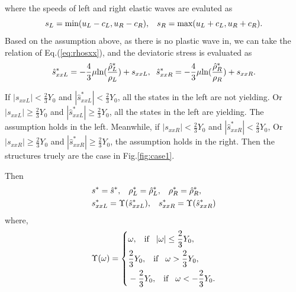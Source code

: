 \documentclass{article}
\numberwithin{equation}{section}
\numberwithin{table}{section}
\begin{document}
where the speeds of left and right elastic waves are evaluted as
	\begin{equation}\label{eq:sLR}
	  s_L = \text{min} (u_L-c_L, u_R-c_R), \hspace{0.3cm} s_R = \text{max}(u_L+c_L, u_R+c_R).
	\end{equation}
Based on the assumption above, as there is no plastic wave in, we can take the relation of Eq.(\ref{eq:rhosxx}), and the deviatoric stress is evaluated as
\begin{equation}
  \hat{s}_{xxL}^*=-\frac{4}{3}\mu\text{ln}(\frac{\hat{\rho}_L^*}{\rho_L})+s_{xxL},\hspace{0.2cm}  \hat{s}_{xxR}^*=-\frac{4}{3}\mu\text{ln}(\frac{\hat{\rho}_R^*}{\rho_R})+s_{xxR}.
\end{equation}

If $|s_{xxL}|<\frac{2}{3}Y_0$ and $|\hat{s}_{xxL}^*| < \frac{2}{3}Y_0$, all the states in the left are not yielding. Or  $|s_{xxL}| \ge \frac{2}{3}Y_0$ and $|\hat{s}_{xxL}^*| \ge  \frac{2}{3}Y_0$, all the states in the left are yielding. The assumption  holds in the left.
Meanwhile, if $|s_{xxR}|<\frac{2}{3}Y_0$ and $|\hat{s}_{xxR}^*| < \frac{2}{3}Y_0$, Or $|s_{xxR}| \ge \frac{2}{3}Y_0$ and $|\hat{s}_{xxR}^*| \ge  \frac{2}{3}Y_0$, the assumption holds in the right. Then the structures  truely are  the case in Fig.\ref{fig:case1}.

Then
\begin{align}
&  s^* = \hat{s}^*,\hspace{0.3cm} \rho^*_L = \hat{\rho}_L^*, \hspace{0.3cm} \rho_R^* = \hat{\rho}_R^*,\\
&  s_{xxL}^*  = \Upsilon(\hat{s}_{xxL}^*),\hspace{0.3cm} s_{xxR}^*  = \Upsilon(\hat{s}_{xxR}^*)
\end{align}
where,
\begin{equation}\label{eq:upsilon}
  \Upsilon(\omega) = \left\{ \begin{aligned}
	  &\omega, \hspace{0.3cm} \text{if} \hspace{0.3cm} |\omega| \le \frac{2}{3}Y_0,\\
	  &\frac{2}{3}Y_0,  \hspace{0.3cm} \text{if} \hspace{0.3cm} \omega > \frac{2}{3}Y_0,\\
	 &-\frac{2}{3}Y_0,  \hspace{0.3cm} \text{if} \hspace{0.3cm} \omega < -\frac{2}{3}Y_0.\\
 \end{aligned}\right.
 \end{equation}
\end{document}
